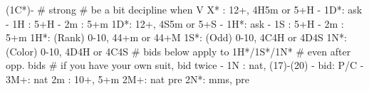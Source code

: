 (1C*)-  # strong
# be a bit decipline when V
X* : 12+, 4H5m or 5+H
   - 1D*: ask
        - 1H : 5+H
        - 2m : 5+m
1D*: 12+, 4S5m or 5+S
   - 1H*: ask
        - 1S : 5+H
        - 2m : 5+m
1H*: (Rank) 0-10, 44+m or 44+M
1S*: (Odd) 0-10, 4C4H or 4D4S
1N*: (Color) 0-10, 4D4H or 4C4S
   # bids below apply to 1H*/1S*/1N*
   # even after opp. bids
   # if you have your own suit, bid twice
   - 1N : nat, (17)-(20)
   - bid: P/C  
   - 3M+: nat
2m : 10+, 5+m
2M+: nat pre
2N*: mms, pre